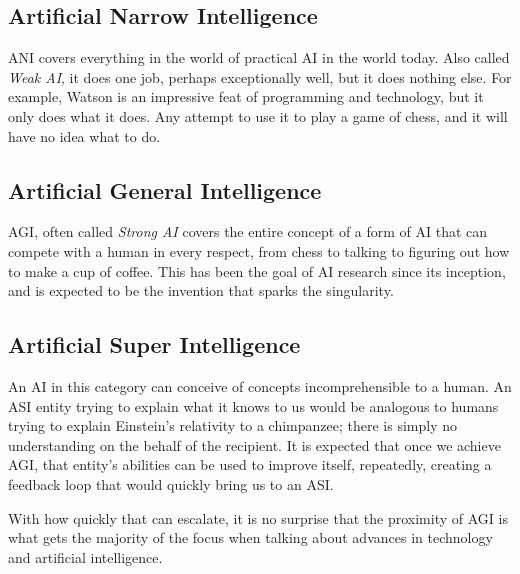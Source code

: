 \documentclass[12pt]{article} %
\begin{document}
\subsection{Artificial Narrow Intelligence} %

ANI covers everything in the world of practical AI in the world today. Also called \textit{Weak AI}\cite{wikiani}, it does one job, perhaps exceptionally well, but it does nothing else. For example, Watson is an impressive feat of programming and technology, but it only does what it does. Any attempt to use it to play a game of chess, and it will have no idea what to do.


\subsection{Artificial General Intelligence} %

AGI, often called \textit{Strong AI}\cite{wikiagi} covers the entire concept of a form of AI that can compete with a human in every respect, from chess to talking to figuring out how to make a cup of coffee. This has been the goal of AI research since its inception, and is expected to be the invention that sparks the singularity.


\subsection{Artificial Super Intelligence} %

An AI in this category can conceive of concepts incomprehensible to a human\cite{wbw}. An ASI entity trying to explain what it knows to us would be analogous to humans trying to explain Einstein's relativity to a chimpanzee; there is simply no understanding on the behalf of the recipient. It is expected that once we achieve AGI, that entity's abilities can be used to improve itself, repeatedly, creating a feedback loop that would quickly bring us to an ASI.

With how quickly that can escalate, it is no surprise that the proximity of AGI is what gets the majority of the focus when talking about advances in technology and artificial intelligence. 


\end{document}
